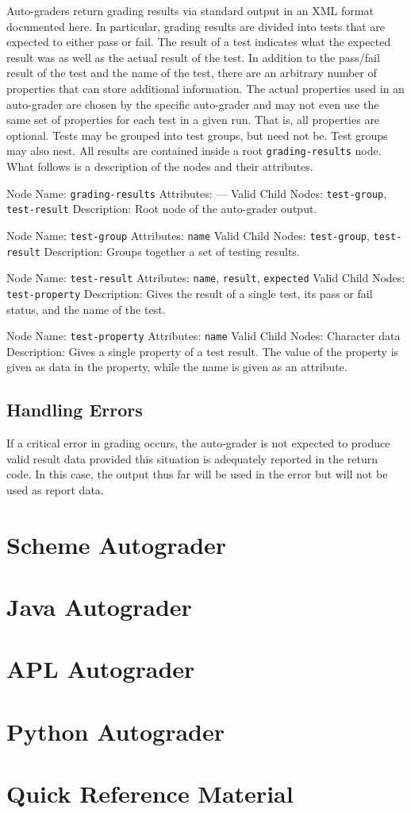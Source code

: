 \noindent
Auto-graders return grading results via standard output in an XML format 
documented here. In particular, grading results are divided into tests that are 
expected to either pass or fail. The result of a test indicates what the 
expected result was as well as the actual result of the test. In addition to 
the pass/fail result of the test and the name of the test, there are 
an arbitrary number of properties that can store additional information. 
The actual properties used in an auto-grader are chosen by the specific
auto-grader and may not even use the same set of properties for each test in a 
given run. That is, all properties are optional. Tests may be grouped 
into test groups, but need not be. Test groups may also nest. All results 
are contained inside a root {\tt grading-results} node. What follows is a 
description of the nodes and their attributes.

\medskip
{\flushleft 
Node Name: {\tt grading-results}
Attributes: ---
Valid Child Nodes: {\tt test-group}, {\tt test-result}
Description: Root node of the auto-grader output.
}\medskip

{\flushleft
Node Name: {\tt test-group}
Attributes: {\tt name}
Valid Child Nodes: {\tt test-group}, {\tt test-result}
Description: Groups together a set of testing results.
}\medskip

{\flushleft
Node Name: {\tt test-result}
Attributes: {\tt name}, {\tt result}, {\tt expected}
Valid Child Nodes: {\tt test-property}
Description: Gives the result of a single test, its pass or fail status, and the 
name of the test.
}\medskip

{\flushleft
Node Name: {\tt test-property}
Attributes: {\tt name}
Valid Child Nodes: Character data
Description: Gives a single property of a test result. The value of the property 
is given as data in the property, while the name is given as an attribute.
}\medskip

\section{Handling Errors}

\noindent
If a critical error in grading occurs, the auto-grader is not expected to 
produce valid result data provided this situation is adequately reported in the 
return code. In this case, the output thus far will be used in the error but 
will not be used as report data. 

\chapter{Scheme Autograder}

\chapter{Java Autograder}

\chapter{APL Autograder}

\chapter{Python Autograder}

\chapter{Quick Reference Material}

\bye
